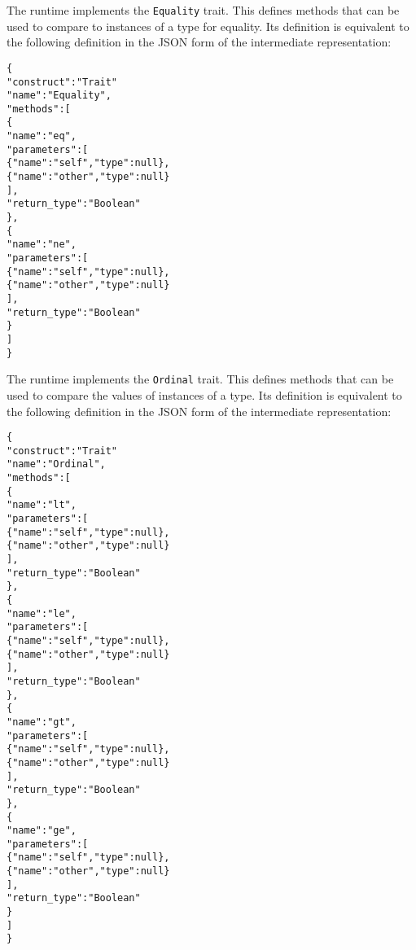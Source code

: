 \documentclass[10pt,twocolumn,a4paper]{article}
\newcommand{\code}[1]{\texttt{#1}}
\begin{document}
The runtime implements the \code{Equality} trait. This defines methods that
can be used to compare to instances of a type for equality.
Its definition is equivalent to the following definition in the JSON
form of the intermediate representation:
\footnotesize
\begin{alltt}
  \{
    "construct" : "Trait"
    "name"      : "Equality",
    "methods"   : [
      \{
        "name"        : "eq",
        "parameters"  : [
          \{"name" : "self",  "type"   : null\},
          \{"name" : "other", "type"   : null\}
        ],
        "return\_type" : "Boolean"
      \},
      \{
        "name"        : "ne",
        "parameters"  : [
          \{"name" : "self",  "type"   : null\},
          \{"name" : "other", "type"   : null\}
        ],
        "return\_type" : "Boolean"
      \}
    ]
  \}
\end{alltt}
\normalsize

The runtime implements the \code{Ordinal} trait. This defines methods that
can be used to compare the values of instances of a type. 
Its definition is equivalent to the following definition in the JSON
form of the intermediate representation:
\footnotesize
\begin{alltt}
  \{
    "construct" : "Trait"
    "name"      : "Ordinal",
    "methods"   : [
      \{
        "name"        : "lt",
        "parameters"  : [
          \{"name" : "self",  "type"   : null\},
          \{"name" : "other", "type"   : null\}
        ],
        "return\_type" : "Boolean"
      \},
      \{
        "name"        : "le",
        "parameters"  : [
          \{"name" : "self",  "type"   : null\},
          \{"name" : "other", "type"   : null\}
        ],
        "return\_type" : "Boolean"
      \},
      \{
        "name"        : "gt",
        "parameters"  : [
          \{"name" : "self",  "type"   : null\},
          \{"name" : "other", "type"   : null\}
        ],
        "return\_type" : "Boolean"
      \},
      \{
        "name"        : "ge",
        "parameters"  : [
          \{"name" : "self",  "type"   : null\},
          \{"name" : "other", "type"   : null\}
        ],
        "return\_type" : "Boolean"
      \}
    ]
  \}
\end{alltt}
\normalsize
\end{document}
